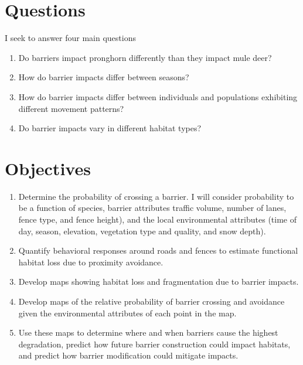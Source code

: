 \documentclass[
]{book}
\providecommand{\tightlist}{%
  \setlength{\itemsep}{0pt}\setlength{\parskip}{0pt}}
\begin{document}
\hypertarget{questions}{%
\section{Questions}\label{questions}}

I seek to answer four main questions

\begin{enumerate}
\def\labelenumi{\arabic{enumi}.}
\tightlist
\item
  Do barriers impact pronghorn differently than they impact mule deer?
\item
  How do barrier impacts differ between seasons?
\item
  How do barrier impacts differ between individuals and populations exhibiting different movement patterns?
\item
  Do barrier impacts vary in different habitat types?
\end{enumerate}

\hypertarget{objectives}{%
\section{Objectives}\label{objectives}}

\begin{enumerate}
\def\labelenumi{\arabic{enumi}.}
\tightlist
\item
  Determine the probability of crossing a barrier. I will consider probability to be a function of species, barrier attributes traffic volume, number of lanes, fence type, and fence height), and the local environmental attributes (time of day, season, elevation, vegetation type and quality, and snow depth).
\item
  Quantify behavioral responses around roads and fences to estimate functional habitat loss due to proximity avoidance.
\item
  Develop maps showing habitat loss and fragmentation due to barrier impacts.
\item
  Develop maps of the relative probability of barrier crossing and avoidance given the environmental attributes of each point in the map.
\item
  Use these maps to determine where and when barriers cause the highest degradation, predict how future barrier construction could impact habitats, and predict how barrier modification could mitigate impacts.\\
\end{enumerate}
\end{document}
